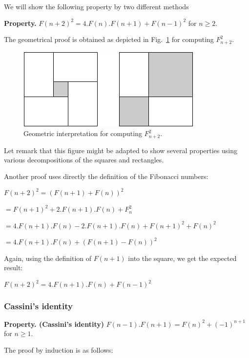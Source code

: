 We will show the following property by two different methods

\noindent \textbf{Property.} 
\label{prop:FiboEmbedded}
$F(n+2)^2 = 4.F(n).F(n+1) + F(n-1)^2$ for $n \geq 2$.


The geometrical proof is obtained as depicted in Fig.~\ref{fig:fibosquareembedded} for computing $F_{n+2}^2$.

\begin{figure}[h]
\begin{center}
        \includegraphics[scale=0.5]{FiguresMaths//FiboSquares}
        \caption{Geometric interpretation for computing $F_{n+2}^2$.}
        \label{fig:fibosquareembedded}
\end{center}
\end{figure}

Let remark that this figure might be adapted to show several properties using various decompositions of the squares and rectangles.

Another proof uses directly the definition of the Fibonacci numbers:


$F(n+2)^2 = (F(n+1) + F(n))^2 $

$= F(n+1)^2+2.F(n+1).F(n)+F_{n}^2$

$= 4.F(n+1).F(n) - 2.F(n+1).F(n) + F(n+1)^2 + F(n)^2$

$= 4.F(n+1).F(n) + (F(n+1) - F(n))^2$

Again, using the definition of $F(n+1)$ into the square, we get the expected result:

$F(n+2)^2 = 4.F(n+1).F(n) + F(n-1)^2$


\subsubsection{Cassini's identity}

\noindent \textbf{Property. (Cassini's identity)} 
\label{prop:cassini}
$F(n-1).F(n+1) = F(n)^2 + (-1)^{n+1}$ for $n \geq 1$.


The proof by induction is as follows:

